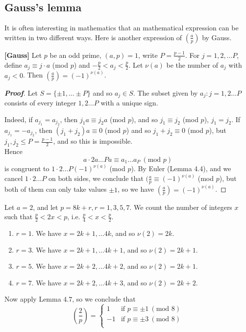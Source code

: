 \subsection{Gauss's lemma}
It is often interesting in mathematics that an mathematical expression can be written in two different ways. Here is another expression of $(\frac{a}{p})$ by Gauss.
\begin{lemma}{\bf [Gauss]}\label{G;Gauss's lemma} Let $p$ be an odd prime, $(a,p)=1$, write $P=\frac{p-1}{2}$. For $j=1,2, \ldots P$, define $a_j \equiv j \cdot a$ (mod $p$) and $-\frac{p}{2} < a_j < \frac{p}{2}$.
Let $\nu(a)$ be the number of $a_j$ with $a_j<0$. Then $(\frac{a}{p})=(-1)^{\nu(a)}$.
\end{lemma}
\begin{proof}[\bf Proof] Let $S=\{\pm 1, \ldots \pm P\}$ and so $a_j \in S$. The subset given by $a_j: j=1,2 \ldots P$ consists of every integer $1,2 \ldots P$ with a unique sign.

Indeed, if $a_{j_1}=a_{j_2}$, then $j_1 a \equiv j_2 a$ (mod $p$), and so $j_1 \equiv j_2$ (mod $p$), $j_1=j_2$.
If $a_{j_1}=-a_{j_2}$, then $(j_1+j_2)a \equiv 0$ (mod $p$) and so $j_1 +j_2 \equiv 0$ (mod $p$), but $j_1,j_2 \le P=\frac{p-1}{2}$, and so this is impossible.\\
Hence
$$a \cdot 2a \ldots Pa \equiv a_1 \ldots a_P~(\text{mod } p)$$
is congruent to $1 \cdot 2 \ldots P (-1)^{\nu(a)}$ (mod $p$).
By Euler (Lemma 4.4), and we cancel $1 \cdot 2 \ldots P$ on both sides, we conclude that
$(\frac{a}{p} \equiv (-1)^{\nu(a)}$ (mod $p$), but both of them can only take values $\pm 1$, so we have $(\frac{a}{p})=(-1)^{\nu(a)}$.
\end{proof}
\begin{example} Let $a=2$, and let $p=8k+r,r=1,3,5,7$. We count the number of integers $x$ such that $\frac{p}{2} < 2x <p$, i.e. $\frac{p}{4} < x < \frac{p}{2}$.
\begin{enumerate}
\item $r=1$. We have $x=2k+1, \ldots 4k$, and so $\nu(2)=2k$.\\
\item $r=3$. We have $x=2k+1, \ldots 4k+1$, and so $\nu(2)=2k+1$.\\
\item $r=5$. We have $x=2k+2, \ldots 4k+2$, and so $\nu(2)=2k+1$.\\
\item $r=7$. We have $x=2k+2, \ldots 4k+3$, and so $\nu(2)=2k+2$.
\end{enumerate}
Now apply Lemma $4.7$, so we conclude that
\begin{equation*}
\left(\frac{2}{p}\right)= \left\{
\begin{array}{ll}
1 & \text{if } p \equiv \pm 1~(\text{mod } 8)\\
-1 & \text{if } p \equiv \pm 3~(\text{mod } 8)\\
\end{array} \right.
\end{equation*}
\end{example}
